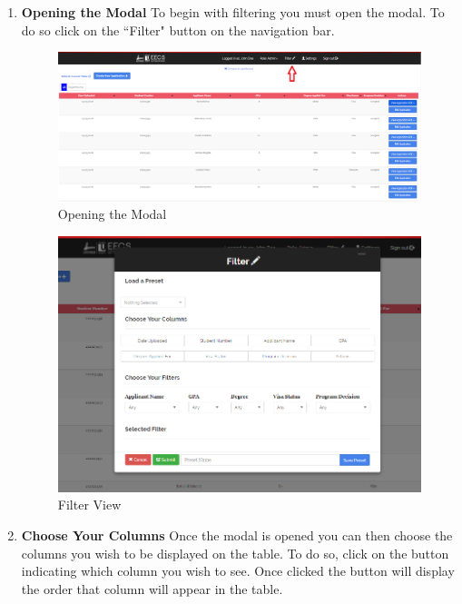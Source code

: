 \documentclass[fontsize=12pt,paper=letter,twoside]{scrartcl}
\begin{document}
\begin{enumerate}


\item \textbf{Opening the Modal} To begin with filtering you must open the modal. To do so click on the ``Filter" button on the navigation bar.

\begin{figure}[!htb]
\begin{center}
\includegraphics[width=.99\textwidth]{images/adm/ma/open_modal.png}
\end{center}
\caption{Opening the  Modal}
\label{fig:adm/open_modal}
\end{figure}

\clearpage

\begin{figure}[!htb]
\begin{center}
\includegraphics[width=.99\textwidth]{images/adm/ma/default_filter_view.png}
\end{center}
\caption{Filter View}
\label{fig:adm/filter_view}
\end{figure}

\item \textbf{Choose Your Columns} Once the modal is opened you can then choose the columns you wish to be displayed on the table. To do so, click on the button indicating which column you wish to see. Once clicked the button will display the order that column will appear in the table.


\end{enumerate}
\end{document}
